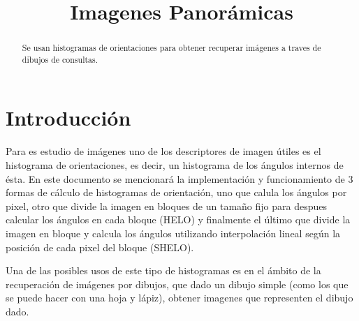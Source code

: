 \documentclass[conference]{IEEEtran}
\begin{document}
\title{Imagenes Panorámicas}
\author{
}


\maketitle

\begin{abstract}
    Se usan histogramas de orientaciones para obtener recuperar imágenes a traves de dibujos de consultas.
\end{abstract}
 

\section*{Introducción} %
    Para es estudio de imágenes uno de los descriptores de imagen útiles es el histograma de orientaciones, es decir, un histograma de los ángulos internos de ésta. En este documento se mencionará la implementación y funcionamiento de 3 formas de cálculo de histogramas de orientación, uno que calula los ángulos por pixel, otro que divide la imagen en bloques de un tamaño fijo para despues calcular los ángulos en cada bloque (HELO) y finalmente el último que divide la imagen en bloque y calcula los ángulos utilizando interpolación lineal según la posición de cada pixel del bloque (SHELO).
    
    Una de las posibles usos de este tipo de histogramas es en el ámbito de la recuperación de imágenes por dibujos, que dado un dibujo simple (como los que se puede hacer con una hoja y lápiz), obtener imagenes que representen el dibujo dado.
    
\end{document}
